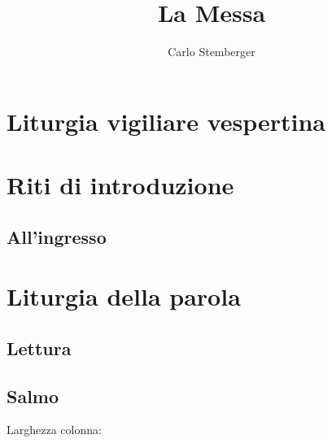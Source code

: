 \documentclass[leaflet,rite=ambrosian,litcolor=red]{missa}
\title{La Messa}
\author{Carlo Stemberger}
\begin{document}


\section{Liturgia vigiliare vespertina}
\lipsum[1]
\section{Riti di introduzione}
\subsection{All'ingresso}
\lipsum[2]
\section{Liturgia della parola}
\subsection{Lettura}
\subsection{Salmo}
\lipsum[1]
\lipsum[1]

\onecolumn \pagebreak \twocolumn Larghezza colonna: \the\columnwidth
\onecolumn \layout \twocolumn
\end{document}
